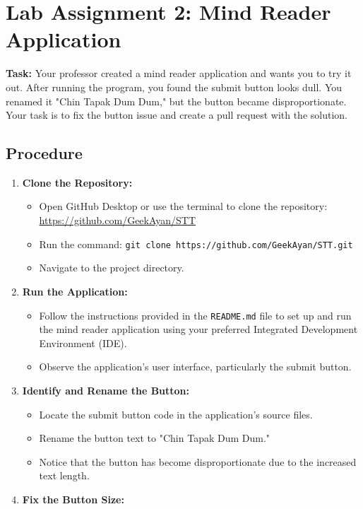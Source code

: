 \documentclass[a4paper,12pt]{report}
\begin{document}
\section{Lab Assignment 2: Mind Reader Application}

\textbf{Task:} Your professor created a mind reader application and wants you to try it out. After running the program, you found the submit button looks dull. You renamed it "Chin Tapak Dum Dum," but the button became disproportionate. Your task is to fix the button issue and create a pull request with the solution.

\subsection*{Procedure}
\begin{enumerate}[label=\arabic*.]
    \item \textbf{Clone the Repository:}
    \begin{itemize}
        \item Open GitHub Desktop or use the terminal to clone the repository: \url{https://github.com/GeekAyan/STT}
        \item Run the command: \texttt{git clone https://github.com/GeekAyan/STT.git}
        \item Navigate to the project directory.
    \end{itemize}
    \item \textbf{Run the Application:}
    \begin{itemize}
        \item Follow the instructions provided in the \texttt{README.md} file to set up and run the mind reader application using your preferred Integrated Development Environment (IDE).
        \item Observe the application's user interface, particularly the submit button.
    \end{itemize}
    \item \textbf{Identify and Rename the Button:}
    \begin{itemize}
        \item Locate the submit button code in the application’s source files.
        \item Rename the button text to "Chin Tapak Dum Dum."
        \item Notice that the button has become disproportionate due to the increased text length.
    \end{itemize}
    \item \textbf{Fix the Button Size:}

\end{enumerate}
\end{document}
